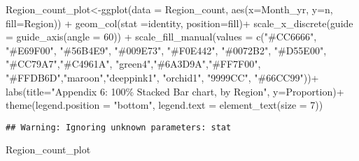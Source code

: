 \documentclass[
  10pt,
]{article}
\newenvironment{Shaded}{\begin{snugshade}}{\end{snugshade}}
\newcommand{\AttributeTok}[1]{\textcolor[rgb]{0.77,0.63,0.00}{#1}}
\newcommand{\DecValTok}[1]{\textcolor[rgb]{0.00,0.00,0.81}{#1}}
\newcommand{\FunctionTok}[1]{\textcolor[rgb]{0.00,0.00,0.00}{#1}}
\newcommand{\NormalTok}[1]{#1}
\newcommand{\OtherTok}[1]{\textcolor[rgb]{0.56,0.35,0.01}{#1}}
\newcommand{\SpecialCharTok}[1]{\textcolor[rgb]{0.00,0.00,0.00}{#1}}
\newcommand{\StringTok}[1]{\textcolor[rgb]{0.31,0.60,0.02}{#1}}
\begin{document}
\begin{Shaded}
\begin{Highlighting}[]
\NormalTok{Region\_count\_plot}\OtherTok{\textless{}{-}}\FunctionTok{ggplot}\NormalTok{(}\AttributeTok{data =}\NormalTok{ Region\_count, }\FunctionTok{aes}\NormalTok{(}\AttributeTok{x=}\NormalTok{Month\_yr, }\AttributeTok{y=}\NormalTok{n, }\AttributeTok{fill=}\NormalTok{Region)) }\SpecialCharTok{+}
  \FunctionTok{geom\_col}\NormalTok{(}\AttributeTok{stat =}\StringTok{\textquotesingle{}identity\textquotesingle{}}\NormalTok{, }\AttributeTok{position=}\StringTok{\textquotesingle{}fill\textquotesingle{}}\NormalTok{)}\SpecialCharTok{+}
  \FunctionTok{scale\_x\_discrete}\NormalTok{(}\AttributeTok{guide =} \FunctionTok{guide\_axis}\NormalTok{(}\AttributeTok{angle =} \DecValTok{60}\NormalTok{)) }\SpecialCharTok{+}
  \FunctionTok{scale\_fill\_manual}\NormalTok{(}\AttributeTok{values =} \FunctionTok{c}\NormalTok{(}\StringTok{"\#CC6666"}\NormalTok{, }\StringTok{"\#E69F00"}\NormalTok{, }\StringTok{"\#56B4E9"}\NormalTok{, }\StringTok{"\#009E73"}\NormalTok{, }\StringTok{"\#F0E442"}\NormalTok{, }
                               \StringTok{"\#0072B2"}\NormalTok{, }\StringTok{"\#D55E00"}\NormalTok{, }\StringTok{"\#CC79A7"}\NormalTok{,}\StringTok{"\#C4961A"}\NormalTok{,}
                               \StringTok{"green4"}\NormalTok{,}\StringTok{"\#6A3D9A"}\NormalTok{,}\StringTok{"\#FF7F00"}\NormalTok{,}
                               \StringTok{"\#FFDB6D"}\NormalTok{,}\StringTok{"maroon"}\NormalTok{,}\StringTok{"deeppink1"}\NormalTok{, }\StringTok{"orchid1"}\NormalTok{, }\StringTok{"9999CC"}\NormalTok{, }\StringTok{"\#66CC99"}\NormalTok{))}\SpecialCharTok{+}
  \FunctionTok{labs}\NormalTok{(}\AttributeTok{title=}\StringTok{"Appendix 6: 100\% Stacked Bar chart, by Region"}\NormalTok{, }\AttributeTok{y=}\StringTok{\textquotesingle{}Proportion\textquotesingle{}}\NormalTok{)}\SpecialCharTok{+}
  \FunctionTok{theme}\NormalTok{(}\AttributeTok{legend.position =} \StringTok{"bottom"}\NormalTok{, }\AttributeTok{legend.text =} \FunctionTok{element\_text}\NormalTok{(}\AttributeTok{size =} \DecValTok{7}\NormalTok{))}
\end{Highlighting}
\end{Shaded}

\begin{verbatim}
## Warning: Ignoring unknown parameters: stat
\end{verbatim}

\begin{Shaded}
\begin{Highlighting}[]
\NormalTok{Region\_count\_plot}
\end{Highlighting}
\end{Shaded}
\end{document}
